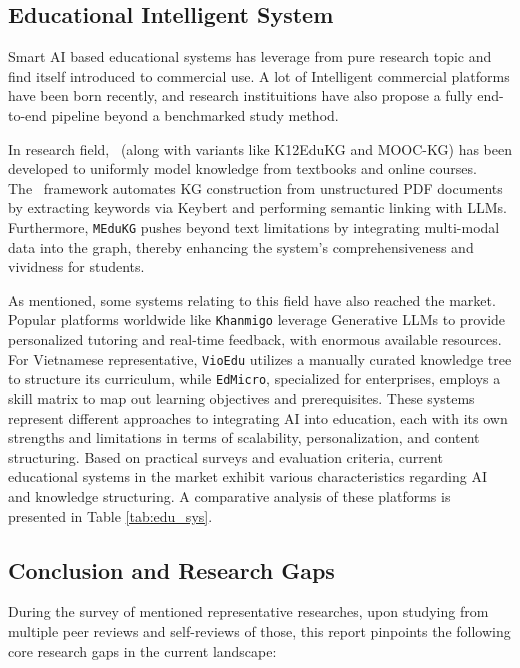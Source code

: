 \subsection{Educational Intelligent System}
Smart AI based educational systems has leverage from pure research topic and find itself introduced to commercial use. A lot of Intelligent commercial platforms have been 
born recently, and research instituitions have also propose a fully end-to-end pipeline beyond a benchmarked study method. 

In research field,~\cite{EduKG} (along with variants like K12EduKG and MOOC-KG) has been developed to uniformly model knowledge from textbooks and online courses. The~\cite{EduKGPipe} framework automates KG construction from unstructured PDF documents by extracting keywords via Keybert and performing semantic linking with LLMs. 
Furthermore, \texttt{MEduKG} pushes beyond text limitations by integrating multi-modal data into the graph, thereby enhancing the system's comprehensiveness and 
vividness for students.

As mentioned, some systems relating to this field have also reached the market. Popular platforms worldwide like \texttt{Khanmigo} leverage 
Generative LLMs to provide personalized tutoring and real-time feedback, with enormous available resources.
For Vietnamese representative, \texttt{VioEdu} utilizes a manually curated knowledge tree to structure its curriculum, while 
\texttt{EdMicro}, specialized for enterprises, employs a skill matrix to map out learning objectives and prerequisites. 
 These systems represent different approaches to integrating AI into education, each with its own strengths and limitations in terms of scalability, personalization, and content structuring.
Based on practical surveys and evaluation criteria, current educational systems in the market exhibit various characteristics regarding AI and knowledge structuring. A comparative analysis of these platforms is presented in Table \ref{tab:edu_sys}.



\subsection{Conclusion and Research Gaps}\label{sub:gaps}
During the survey of mentioned representative researches, upon studying from multiple peer reviews and self-reviews of those, this report pinpoints the following core 
research gaps in the current landscape:

